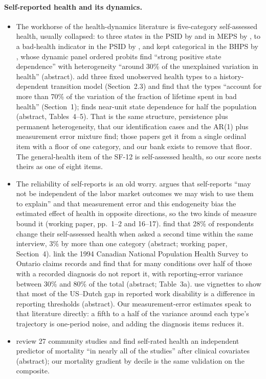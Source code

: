 \documentclass[11pt]{article}
\begin{document}
\paragraph{Self-reported health and its dynamics.}
\begin{itemize}
\item The workhorse of the health-dynamics literature is five-category self-assessed health, usually collapsed: to three states in the PSID by \citet[Section~2.1]{denardi2025} and in MEPS by \citet[Section~4.1]{capatina2015}, to a bad-health indicator in the PSID by \citet[Section~2]{halliday2008}, and kept categorical in the BHPS by \citet{contoyannis2004}, whose dynamic panel ordered probits find ``strong positive state dependence'' with heterogeneity ``around 30\% of the unexplained variation in health'' (abstract). \citet{denardi2025} add three fixed unobserved health types to a history-dependent transition model (Section~2.3) and find that the types ``account for more than 70\% of the variation of the fraction of lifetime spent in bad health'' (Section~1); \citet{halliday2008} finds near-unit state dependence for half the population (abstract, Tables~4--5). That is the same structure, persistence plus permanent heterogeneity, that our identification cases and the AR(1) plus measurement error mixture find; those papers get it from a single ordinal item with a floor of one category, and our bank exists to remove that floor. The general-health item of the SF-12 is self-assessed health, so our score nests theirs as one of eight items.
\item The reliability of self-reports is an old worry. \citet{bound1991} argues that self-reports ``may not be independent of the labor market outcomes we may wish to use them to explain'' and that measurement error and this endogeneity bias the estimated effect of health in opposite directions, so the two kinds of measure bound it (working paper, pp.~1--2 and 16--17). \citet{crossley2002} find that 28\% of respondents change their self-assessed health when asked a second time within the same interview, 3\% by more than one category (abstract; working paper, Section~4). \citet{baker2004} link the 1994 Canadian National Population Health Survey to Ontario claims records and find that for many conditions over half of those with a recorded diagnosis do not report it, with reporting-error variance between 30\% and 80\% of the total (abstract; Table~3a). \citet{kapteyn2007} use vignettes to show that most of the US--Dutch gap in reported work disability is a difference in reporting thresholds (abstract). Our measurement-error estimates speak to that literature directly: a fifth to a half of the variance around each type's trajectory is one-period noise, and adding the diagnosis items reduces it.
\item \citet{idler1997} review 27 community studies and find self-rated health an independent predictor of mortality ``in nearly all of the studies'' after clinical covariates (abstract); our mortality gradient by decile is the same validation on the composite.
\end{itemize}
\end{document}
